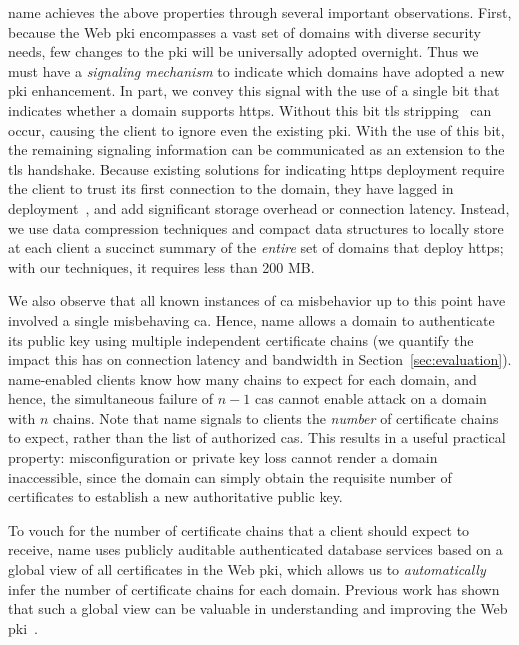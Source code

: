 \ac{name} achieves the above properties through several important observations.
First, because the Web \ac{pki} encompasses a vast set of domains with diverse
security needs, few changes to the \ac{pki} will be universally adopted
overnight. Thus we must have a \emph{signaling mechanism} to indicate which
domains have adopted a new \ac{pki} enhancement. In part, we convey this signal
with the use of a single bit that indicates whether a domain supports
\ac{https}. Without this bit \ac{tls} stripping~\cite{marlinspike2009new} can
occur, causing the client to ignore even the existing \ac{pki}. With the use of
this bit, the remaining signaling information can be communicated as an
extension to the \ac{tls} handshake. Because existing solutions for indicating
\ac{https} deployment require the client to trust its first connection to the
domain, they have lagged in deployment~\cite{rfc4033, rfc6698}, and add
significant storage overhead
or connection
latency. Instead, we
use data compression techniques and compact data structures to locally store at
each client a succinct summary of the \emph{entire} set of domains that deploy
\ac{https}; with our techniques, it requires less than 200 MB.

We also observe that all known instances of \ac{ca} misbehavior up to this point
have involved a single misbehaving \ac{ca}.  Hence, \ac{name} allows a domain to
authenticate its public key using multiple independent certificate chains (we
quantify the impact this has on connection latency and bandwidth in
Section~\ref{sec:evaluation}). \ac{name}-enabled clients know how many chains to
expect for each domain, and hence, the simultaneous failure of $n-1$ \acp{ca}
cannot enable  attack on a domain with $n$ chains. Note that \ac{name}
signals to clients the \emph{number} of certificate chains to expect, rather
than the list of authorized \acp{ca}.  This results in a useful practical
property: misconfiguration or private key loss cannot render a domain
inaccessible, since the domain can simply obtain the requisite number of
certificates to establish a new authoritative public key.

To vouch for the number of certificate chains that a client should expect to
receive, \ac{name} uses publicly auditable authenticated database services based
on a global view of all certificates in the Web \ac{pki}, which allows us to
\emph{automatically} infer the number of certificate chains for each domain.
Previous work has shown that such a global view can be valuable in understanding
and improving the Web \ac{pki}~\cite{durumeric2015search, larisch2017crlite}.

